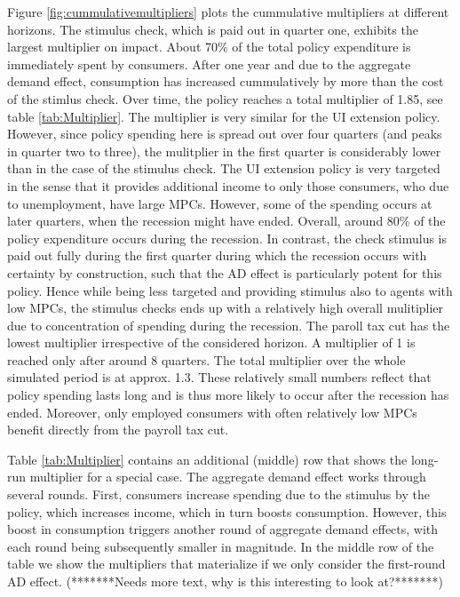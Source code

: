 \documentclass[../HAFiscal]{subfiles}
\begin{document}
Figure \ref{fig:cummulativemultipliers} plots the cummulative multipliers at different horizons. The stimulus check, which is paid out in quarter one, exhibits the largest multiplier on impact. About 70\% of the total policy expenditure is immediately spent by consumers. After one year and due to the aggregate demand effect, consumption has increased cummulatively by more than the cost of the stimlus check. Over time, the policy reaches a total multiplier of 1.85, see table \ref{tab:Multiplier}.
The multiplier is very similar for the UI extension policy. However, since policy spending here is spread out over four quarters (and peaks in quarter two to three), the mulitplier in the first quarter is considerably lower than in the case of the stimulus check. 
The UI extension policy is very targeted in the sense that it provides additional income to only those consumers, who due to unemployment, have large MPCs. However, some of the spending occurs at later quarters, when the recession might have ended. Overall, around 80\% of the policy expenditure occurs during the recession. In contrast, the check stimulus is paid out fully during the first quarter during which the recession occurs with certainty by construction, such that the AD effect is particularly potent for this policy. Hence while being less targeted and providing stimulus also to agents with low MPCs, the stimulus checks ends up with a relatively high overall mulitiplier due to concentration of spending during the recession.
The paroll tax cut has the lowest multiplier irrespective of the considered horizon. A multiplier of 1 is reached only after around 8 quarters. The total multiplier over the whole simulated period is at approx. 1.3. These relatively small numbers reflect that policy spending lasts long and is thus more likely to occur after the recession has ended. Moreover, only employed consumers with often relatively low MPCs benefit directly from the payroll tax cut. 

Table \ref{tab:Multiplier} contains an additional (middle) row that shows the long-run multiplier for a special case. The aggregate demand effect works through several rounds. First, consumers increase spending due to the stimulus by the policy, which increases income, which in turn boosts consumption. However, this boost in consumption triggers another round of aggregate demand effects, with each round being subsequently smaller in magnitude. In the middle row of the table we show the multipliers that materialize if we only consider the first-round AD effect. (*******Needs more text, why is this interesting to look at?*******)
\end{document}
